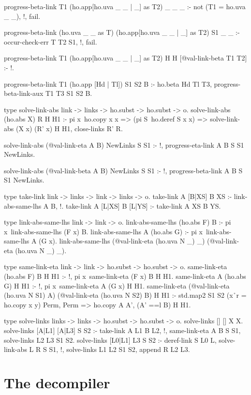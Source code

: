 \begin{elpicode}
  progress-beta-link T1 (ho.app[ho.uva _ _ | _] as T2) _ _ _ :- 
    not (T1 = ho.uva _ _), !, fail.

  progress-beta-link (ho.uva _ _ as T) (ho.app[ho.uva _ _ | _] as T2) S1 _ _ :- 
    occur-check-err T T2 S1, !, fail.

  progress-beta-link T1 (ho.app[ho.uva _ _ | _] as T2) H H [@val-link-beta T1 T2] :- !.

  progress-beta-link T1 (ho.app [Hd | Tl]) S1 S2 B :-
    ho.beta Hd Tl T3, 
    progress-beta-link-aux T1 T3 S1 S2 B.

  type solve-link-abs link -> links -> ho.subst -> ho.subst -> o.
  solve-link-abs (ho.abs X) R H H1 :- 
    pi x\ ho.copy x x => (pi S\ ho.deref S x x) => 
      solve-link-abs (X x) (R' x) H H1,
    close-links R' R.

  solve-link-abs (@val-link-eta A B) NewLinks S S1 :- !,
    progress-eta-link A B S S1 NewLinks.

  solve-link-abs (@val-link-beta A B) NewLinks S S1 :- !,
    progress-beta-link A B S S1 NewLinks.

  type take-link link -> links -> link -> links -> o.
  take-link A [B|XS] B XS :- link-abs-same-lhs A B, !.
  take-link A [L|XS] B [L|YS] :- take-link A XS B YS.

  type link-abs-same-lhs link -> link -> o.
  link-abs-same-lhs (ho.abs F) B :- 
    pi x\ link-abs-same-lhs (F x) B.
  link-abs-same-lhs A (ho.abs G) :- 
    pi x\ link-abs-same-lhs A (G x).
  link-abs-same-lhs (@val-link-eta (ho.uva N _) _) (@val-link-eta (ho.uva N _) _).

  type same-link-eta link -> link -> ho.subst -> ho.subst -> o.
  same-link-eta (ho.abs F) B H H1 :- !, pi x\ same-link-eta (F x) B H H1.
  same-link-eta A (ho.abs G) H H1 :- !, pi x\ same-link-eta A (G x) H H1.
  same-link-eta (@val-link-eta (ho.uva N S1) A)
                (@val-link-eta (ho.uva N S2) B) H H1 :-
    std.map2 S1 S2 (x\y\r\ r = ho.copy x y) Perm,
    Perm => ho.copy A A',
    (A' ==l B) H H1.

  type solve-links links -> links -> ho.subst -> ho.subst -> o.
  solve-links [] [] X X.
  solve-links [A|L1] [A|L3] S S2 :- take-link A L1 B L2, !,
    same-link-eta A B S S1, 
    solve-links L2 L3 S1 S2.
  solve-links [L0|L1] L3 S S2 :- deref-link S L0 L,
    solve-link-abs L R S S1, !,
    solve-links L1 L2 S1 S2, append R L2 L3.
\end{elpicode}

\section{The decompiler}

